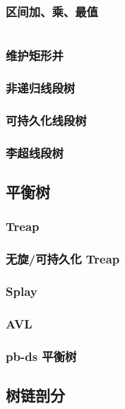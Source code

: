 \documentclass[a4paper, twoside]{article}
\begin{document}
    \subsubsection{区间加、乘、最值}
    \inputminted{cpp}{../src/数据结构/线段树（区间加、乘、最值）.cpp}

    \subsubsection{维护矩形并}

    \subsubsection{非递归线段树}

    \subsubsection{可持久化线段树}

    \subsubsection{李超线段树}

\subsection{平衡树}
    \subsubsection{Treap}

    \subsubsection{无旋/可持久化 Treap}

    \subsubsection{Splay}

    \subsubsection{AVL}

    \subsubsection{pb-ds 平衡树}

\subsection{树链剖分}
\end{document}
